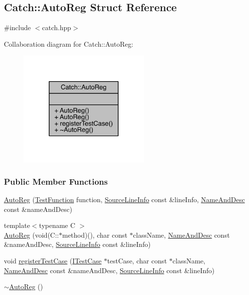 \hypertarget{a00007}{}\subsection{Catch\+:\+:Auto\+Reg Struct Reference}
\label{a00007}


{\ttfamily \#include $<$catch.\+hpp$>$}



Collaboration diagram for Catch\+:\+:Auto\+Reg\+:\nopagebreak
\begin{figure}[H]
\begin{center}
\leavevmode
\includegraphics[width=186pt]{a00176}
\end{center}
\end{figure}
\subsubsection*{Public Member Functions}
\begin{DoxyCompactItemize}
\item 
\hyperlink{a00007_af224f4568d57b8652474df475a164a8c}{Auto\+Reg} (\hyperlink{a00117_a26414f52d0835939fae52aadd27e6257}{Test\+Function} function, \hyperlink{a00075}{Source\+Line\+Info} const \&line\+Info, \hyperlink{a00053}{Name\+And\+Desc} const \&name\+And\+Desc)
\item 
{\footnotesize template$<$typename C $>$ }\\\hyperlink{a00007_a1bf9207fe0a02b46dc0ab1cc03cbe738}{Auto\+Reg} (void(C\+::$\ast$method)(), char const $\ast$class\+Name, \hyperlink{a00053}{Name\+And\+Desc} const \&name\+And\+Desc, \hyperlink{a00075}{Source\+Line\+Info} const \&line\+Info)
\item 
void \hyperlink{a00007_a2dc6a03e838b31e29fcd6a740195b55b}{register\+Test\+Case} (\hyperlink{a00045}{I\+Test\+Case} $\ast$test\+Case, char const $\ast$class\+Name, \hyperlink{a00053}{Name\+And\+Desc} const \&name\+And\+Desc, \hyperlink{a00075}{Source\+Line\+Info} const \&line\+Info)
\item 
\hyperlink{a00007_a3cdb53f1e5ff115310f3372bebe198f1}{$\sim$\+Auto\+Reg} ()
\end{DoxyCompactItemize}


